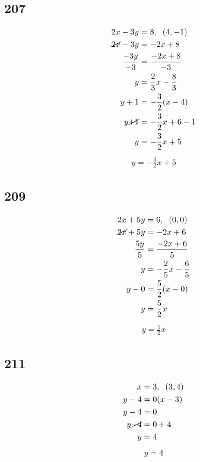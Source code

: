 \documentclass{article}
\begin{document}
    \subsection*{207}
    \begin{align*}
        2x - 3y  &= 8, \hspace{.2cm} (4, -1)\\
        \cancel{2x} - 3y  &= -2x + 8 \\
        \frac{-3y}{-3}  &= \frac{-2x + 8}{-3}\\
        y &= \frac{2}{3}x - \frac{8}{3}\\
        y + 1 &= -\frac{3}{2}(x - 4) \\
        y \cancel{+1} &= -\frac{3}{2}x + 6 -1 \\
        y &= -\frac{3}{2}x + 5\\
    \end{align*}
    \begin{align*}
        \boxed{y = -\frac{3}{2}x + 5}
    \end{align*}

    \subsection*{209}
    \begin{align*}
        2x + 5y  &= 6, \hspace{.2cm} (0, 0)\\
        \cancel{2x} + 5y  &= -2x + 6 \\
        \frac{5y}{5}  &= \frac{-2x + 6}{5}\\
        y &= -\frac{2}{5}x - \frac{6}{5}\\
        y - 0 &= \frac{5}{2}(x - 0) \\
        y &= \frac{5}{2}x \\
    \end{align*}
    \begin{align*}
        \boxed{y = \frac{5}{2}x}
    \end{align*}

    \subsection*{211}
    \begin{align*}
        x &= 3, \hspace{.2cm} (3, 4)\\
        y - 4 &= 0(x - 3)\\
        y - 4 &= 0 \\
        y \cancel{-4} & = 0 +4\\
        y &= 4\\
    \end{align*}
    \begin{align*}
        \boxed{y = 4}
    \end{align*}
\end{document}
